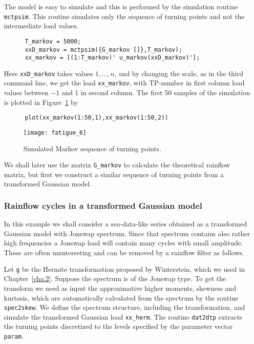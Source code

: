 
The model is easy to simulate and this is performed by the simulation routine
\verb+mctpsim+. This routine simulates only the
sequence of turning points and not the intermediate load values.
{\small\begin{verbatim}
      T_markov = 5000;
      xxD_markov = mctpsim({G_markov []},T_markov);
      xx_markov = [(1:T_markov)' u_markov(xxD_markov)'];
\end{verbatim}}
Here \verb+xxD_markov+ takes values $1,\ldots,n$, and by changing
the scale, as in the third command line,
we get the load \verb+xx_markov+, with TP-number in first column load values between
$-1$ and 1 in second column. The first 50 samples of the simulation is plotted
in Figure~\ref{fig_wafo_6.2} by
{\small\begin{verbatim}
      plot(xx_markov(1:50,1),xx_markov(1:50,2))
\end{verbatim}}

\begin{figure}[tbh]
\centering
\texttt{[image: fatigue\_6]}
\vspace{-3mm}
\caption[Simulated Markov sequence of turning points]
{Simulated Markov sequence of turning points.}
\label{fig_wafo_6.2}
\end{figure}

We shall later use the matrix \verb+G_markov+ to calculate the
theoretical rainflow matrix, but first we construct a similar
sequence of turning points from a transformed Gaussian model.

\subsubsection{Rainflow cycles in a transformed Gaussian model}
\label{sec:RFC_filtered}
In this example we shall consider a sea-data-like series obtained as
a transformed Gaussian model with {\sc Jonswap} spectrum.
Since that 
spectrum contains also rather high frequencies a {\sc Jonswap} load will
contain many cycles with small amplitude. These are often uninteresting
and can be removed by a rainflow filter as follows.

Let {\tt g} be the Hermite transformation proposed by Winterstein,
which we used in Chapter~\ref{cha:2}. Suppose the spectrum 
is of the {\sc Jonswap} type. To get the transform we need as input the
approximative higher moments, skewness and kurtosis, which are
automatically calculated from the spectrum by the routine
\verb+spec2skew+. We define the spectrum structure,
including the transformation, and simulate the transformed Gaussian
load \verb+xx_herm+. The routine {\tt dat2dtp}
extracts the turning points discretized to the
levels specified by the parameter vector {\tt param}.

